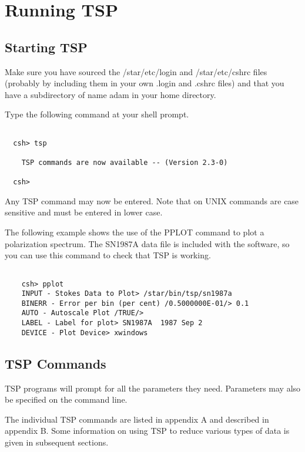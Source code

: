 \documentclass[11pt,twoside]{article}
\renewcommand{\_}{\texttt{\symbol{95}}}
\begin{document}
\section{Running TSP}

\subsection{Starting TSP}

Make sure you have sourced the /star/etc/login and /star/etc/cshrc files (probably by including them in your own .login and .cshrc files) and that you have a subdirectory of name adam in your home directory.

Type the following command at your shell prompt.

\begin{verbatim}

  csh> tsp

    TSP commands are now available -- (Version 2.3-0)

  csh>
\end{verbatim}

Any TSP command may now be entered. Note that on UNIX commands are case sensitive and must be entered in lower case.

The following example shows the use of the
PPLOT command to plot a polarization spectrum. The SN1987A data file is
included with the software, so you can use this command to check that TSP
is working.

\begin{verbatim}

    csh> pplot
    INPUT - Stokes Data to Plot> /star/bin/tsp/sn1987a
    BINERR - Error per bin (per cent) /0.5000000E-01/> 0.1
    AUTO - Autoscale Plot /TRUE/>
    LABEL - Label for plot> SN1987A  1987 Sep 2
    DEVICE - Plot Device> xwindows

\end{verbatim}



\subsection{TSP Commands}

TSP programs will prompt for all the parameters they need. Parameters may
also be specified on the command line.

The individual TSP commands are listed in appendix A and described in appendix
B. Some information on using TSP to reduce various types of data is given in
subsequent sections.
\end{document}
